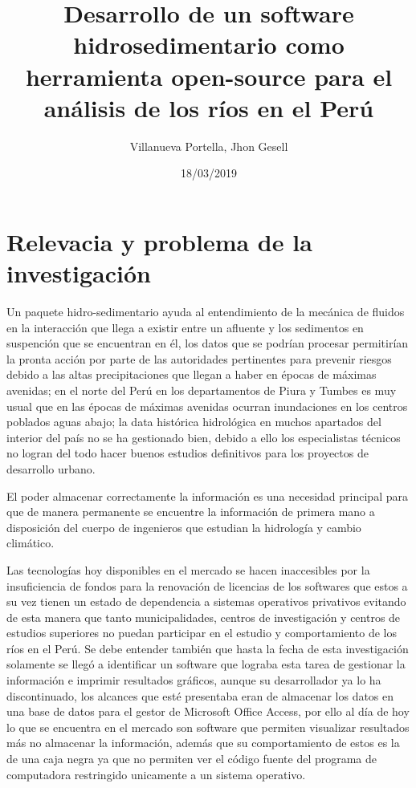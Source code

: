 \documentclass[12pt,a4paper]{report}
\begin{document}
\title{Desarrollo de un software hidrosedimentario como herramienta open-source para el análisis de los ríos en el Perú}
\author{Villanueva Portella, Jhon Gesell}
\date{18/03/2019}
\maketitle
\section{Relevacia y problema de la investigación}
Un paquete hidro-sedimentario ayuda al entendimiento de la mecánica de fluidos en la interacción que llega a existir entre un afluente y los sedimentos en suspención que se encuentran en él, los datos que se podrían procesar permitirían la pronta acción por parte de las autoridades pertinentes para prevenir riesgos debido a las altas precipitaciones que llegan a haber en épocas de máximas avenidas; en el norte del Perú en los departamentos de Piura y Tumbes es muy usual que en las épocas de máximas avenidas ocurran inundaciones en los centros poblados aguas abajo; la data histórica hidrológica en muchos apartados del interior del país no se ha gestionado bien, debido a ello los especialistas técnicos no logran del todo hacer buenos estudios definitivos para los proyectos de desarrollo urbano.

El poder almacenar correctamente la información es una necesidad principal para que de manera permanente se encuentre la información de primera mano a disposición del cuerpo de ingenieros que estudian la hidrología y cambio climático.

Las tecnologías hoy disponibles en el mercado se hacen inaccesibles por la insuficiencia de fondos para la renovación de licencias de los softwares que estos a su vez tienen un estado de dependencia a sistemas operativos privativos evitando de esta manera que tanto municipalidades, centros de investigación y centros de estudios superiores no puedan participar en el estudio y comportamiento de los ríos en el Perú. Se debe entender también que hasta la fecha de esta investigación solamente se llegó a identificar un software que lograba esta tarea de gestionar la información e imprimir resultados gráficos, aunque su desarrollador ya lo ha discontinuado, los alcances que esté presentaba eran de almacenar los datos en una base de datos para el gestor de Microsoft Office Access, por ello al día de hoy lo que se encuentra en el mercado son software que permiten visualizar resultados más no almacenar la información, además que su comportamiento de estos es la de una caja negra ya que no permiten ver el código fuente del programa de computadora restringido unicamente a un sistema operativo.
\end{document}
